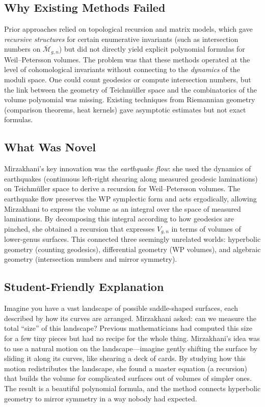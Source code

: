 \subsection{Why Existing Methods Failed}
Prior approaches relied on topological recursion and matrix models, which gave \emph{recursive structures} for certain enumerative invariants (such as intersection numbers on $\overline{\mathcal{M}}_{g,n}$) but did not directly yield explicit polynomial formulas for Weil--Petersson volumes. The problem was that these methods operated at the level of cohomological invariants without connecting to the \emph{dynamics} of the moduli space. One could count geodesics or compute intersection numbers, but the link between the geometry of Teichm\"uller space and the combinatorics of the volume polynomial was missing. Existing techniques from Riemannian geometry (comparison theorems, heat kernels) gave asymptotic estimates but not exact formulas.

\subsection{What Was Novel}
Mirzakhani's key innovation was the \emph{earthquake flow}: she used the dynamics of earthquakes (continuous left-right shearing along measured geodesic laminations) on Teichm\"uller space to derive a recursion for Weil--Petersson volumes. The earthquake flow preserves the WP symplectic form and acts ergodically, allowing Mirzakhani to express the volume as an integral over the space of measured laminations. By decomposing this integral according to how geodesics are pinched, she obtained a recursion that expresses $V_{g,n}$ in terms of volumes of lower-genus surfaces. This connected three seemingly unrelated worlds: hyperbolic geometry (counting geodesics), differential geometry (WP volumes), and algebraic geometry (intersection numbers and mirror symmetry).

\subsection{Student-Friendly Explanation}
Imagine you have a vast landscape of possible saddle-shaped surfaces, each described by how its curves are arranged. Mirzakhani asked: can we measure the total ``size'' of this landscape? Previous mathematicians had computed this size for a few tiny pieces but had no recipe for the whole thing. Mirzakhani's idea was to use a natural motion on the landscape---imagine gently shifting the surface by sliding it along its curves, like shearing a deck of cards. By studying how this motion redistributes the landscape, she found a master equation (a recursion) that builds the volume for complicated surfaces out of volumes of simpler ones. The result is a beautiful polynomial formula, and the method connects hyperbolic geometry to mirror symmetry in a way nobody had expected.

